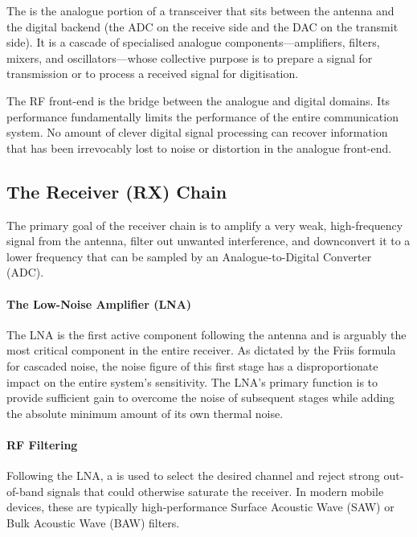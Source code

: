 The  is the analogue portion of a transceiver that sits between the antenna and the digital backend (the ADC on the receive side and the DAC on the transmit side). It is a cascade of specialised analogue components—amplifiers, filters, mixers, and oscillators—whose collective purpose is to prepare a signal for transmission or to process a received signal for digitisation.

\begin{keyconcept}
    The RF front-end is the bridge between the analogue and digital domains. Its performance fundamentally limits the performance of the entire communication system. No amount of clever digital signal processing can recover information that has been irrevocably lost to noise or distortion in the analogue front-end.
\end{keyconcept}

\subsection{The Receiver (RX) Chain}

The primary goal of the receiver chain is to amplify a very weak, high-frequency signal from the antenna, filter out unwanted interference, and downconvert it to a lower frequency that can be sampled by an Analogue-to-Digital Converter (ADC).

\paragraph{The Low-Noise Amplifier (LNA)}
The LNA is the first active component following the antenna and is arguably the most critical component in the entire receiver. As dictated by the Friis formula for cascaded noise, the noise figure of this first stage has a disproportionate impact on the entire system's sensitivity. The LNA's primary function is to provide sufficient gain to overcome the noise of subsequent stages while adding the absolute minimum amount of its own thermal noise.

\paragraph{RF Filtering}
Following the LNA, a  is used to select the desired channel and reject strong out-of-band signals that could otherwise saturate the receiver. In modern mobile devices, these are typically high-performance Surface Acoustic Wave (SAW) or Bulk Acoustic Wave (BAW) filters.

